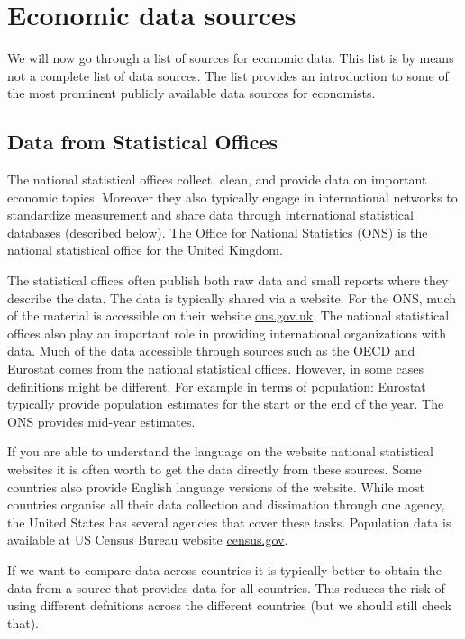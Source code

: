 \documentclass[]{book}
\begin{document}
\hypertarget{economic-data-sources}{%
\section{Economic data sources}\label{economic-data-sources}}

We will now go through a list of sources for economic data. This list is by means not a complete list of data sources. The list provides an introduction to some of the most prominent publicly available data sources for economists.

\hypertarget{data-from-statistical-offices}{%
\subsection{Data from Statistical Offices}\label{data-from-statistical-offices}}

The national statistical offices collect, clean, and provide data on important economic topics. Moreover they also typically engage in international networks to standardize measurement and share data through international statistical databases (described below). The Office for National Statistics (ONS) is the national statistical office for the United Kingdom.

The statistical offices often publish both raw data and small reports where they describe the data. The data is typically shared via a website. For the ONS, much of the material is accessible on their website \href{https://www.ons.gov.uk/}{ons.gov.uk}. The national statistical offices also play an important role in providing international organizations with data. Much of the data accessible through sources such as the OECD and Eurostat comes from the national statistical offices. However, in some cases definitions might be different. For example in terms of population: Eurostat typically provide population estimates for the start or the end of the year. The ONS provides mid-year estimates.

If you are able to understand the language on the website national statistical websites it is often worth to get the data directly from these sources. Some countries also provide English language versions of the website. While most countries organise all their data collection and dissimation through one agency, the United States has several agencies that cover these tasks. Population data is available at US Census Bureau website \href{https://www.census.gov/}{census.gov}.

If we want to compare data across countries it is typically better to obtain the data from a source that provides data for all countries. This reduces the risk of using different defnitions across the different countries (but we should still check that).
\end{document}
